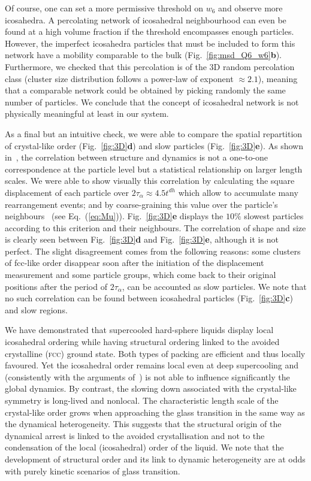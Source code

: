 Of course, one can set a more permissive threshold on $w_6$ and observe more icosahedra. A percolating network of icosahedral neighbourhood can even be found at a high volume fraction if the threshold encompasses enough particles. However, the imperfect icosahedra particles that must be included to form this network have a mobility comparable to the bulk (Fig.~\ref{fig:msd_Q6_w6}\textbf{b}). Furthermore, we checked that this percolation is of the 3D random percolation class (cluster size distribution follows a power-law of exponent $\approx 2.1$), meaning that a comparable network could be obtained by picking randomly the same number of particles. We conclude that the concept of icosahedral network is not physically meaningful at least in our system.

As a final but an intuitive check, we were able to compare the spatial repartition of crystal-like order (Fig.~\ref{fig:3D}\textbf{d}) and slow particles (Fig.~\ref{fig:3D}\textbf{e}). As shown in~\citep{Berthier2007}, the correlation between structure and dynamics is not a one-to-one correspondence at the particle level but a statistical relationship on larger length scales. We were able to show visually this correlation by calculating the square displacement of each particle over $2\tau_\alpha\approx 4.5t^{dh}$ which allow to accumulate many rearrangement events; and by coarse-graining this value over the particle's neighbours~\citep{Berthier2007} (see Eq.~(\ref{eq:Mu})). Fig.~\ref{fig:3D}\textbf{e} displays the $10\%$ slowest particles according to this criterion and their neighbours. The correlation of shape and size is clearly seen between Fig.~\ref{fig:3D}\textbf{d} and Fig.~\ref{fig:3D}\textbf{e}, although it is not perfect. The slight disagreement comes from the following reasons: some clusters of fcc-like order disappear soon after the initiation of the displacement measurement and some particle groups, which come back to their original positions after the period of $2\tau_\alpha$, can be accounted as slow particles. We note that no such correlation can be found between icosahedral particles (Fig.~\ref{fig:3D}\textbf{c}) and slow regions.


We have demonstrated that supercooled hard-sphere liquids display local icosahedral ordering while having structural ordering linked to the avoided crystalline (\textsc{fcc}) ground state. Both types of packing are efficient and thus locally favoured. Yet the icosahedral order remains local even at deep supercooling and (consistently with the arguments of~\citep{Berthier2007}) is not able to influence significantly the global dynamics. By contrast, the slowing down associated with the crystal-like symmetry is long-lived and  nonlocal. The characteristic length scale of the crystal-like order grows when approaching the glass transition in the same way as the dynamical heterogeneity. This suggests that the structural origin of the dynamical arrest is linked to the avoided crystallisation and not to the condensation of the local (icosahedral) order of the liquid. We note that the development of structural order and its link to dynamic heterogeneity are at odds with purely kinetic scenarios of glass transition. 

